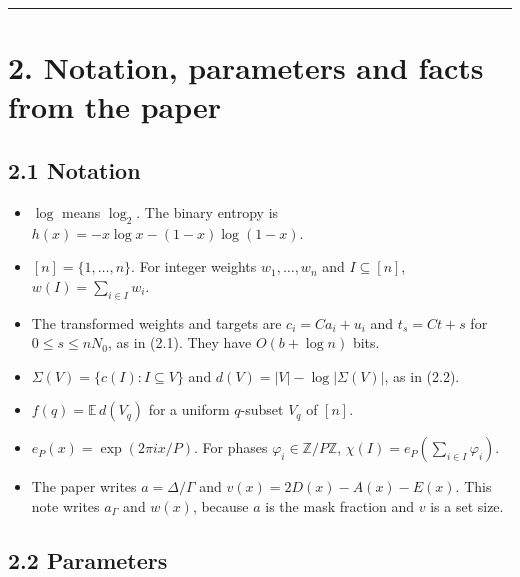 \documentclass[10pt,a4paper]{article}
\begin{document}
\medskip\noindent\rule{\linewidth}{0.4pt}\medskip

\section*{2. Notation, parameters and facts from the paper}

\subsection*{2.1 Notation}

\begin{itemize}
\item $\log$ means $\log_2$. The binary entropy is $h(x) = -x\log x - (1-x)\log(1-x)$.
\item $[n] = \{1, \dots, n\}$. For integer weights $w_1, \dots, w_n$ and $I \subseteq [n]$, $w(I) = \sum_{i\in I} w_i$.
\item The transformed weights and targets are $c_i = Ca_i + u_i$ and $t_s = Ct + s$ for $0 \le s \le nN_0$, as in (2.1).
They have $O(b + \log n)$ bits.
\item $\Sigma(V) = \{c(I) : I \subseteq V\}$ and $d(V) = |V| - \log|\Sigma(V)|$, as in (2.2).
\item $f(q) = \mathbb E\, d(V_q)$ for a uniform $q$-subset $V_q$ of $[n]$.
\item $e_P(x) = \exp(2\pi i x/P)$. For phases $\varphi_i \in \mathbb Z/P\mathbb Z$, $\chi(I) = e_P(\sum_{i \in I}\varphi_i)$.
\item The paper writes $a = \Delta/\Gamma$ and $v(x) = 2D(x) - A(x) - E(x)$. This note writes $a_\Gamma$ and $w(x)$,
because $a$ is the mask fraction and $v$ is a set size.
\end{itemize}

\subsection*{2.2 Parameters}
\end{document}
